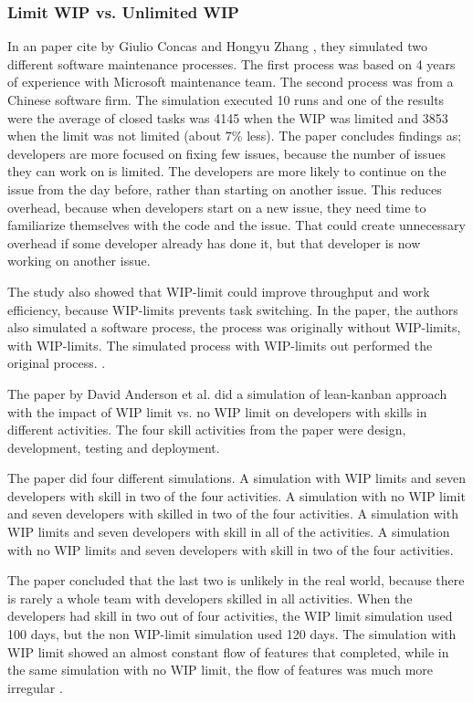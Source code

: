\documentclass[UKenglish]{ifimaster}  %
\begin{document}
\subsubsection {Limit WIP vs. Unlimited WIP}
\label{sub:wip:vs:wip}
In an paper cite by Giulio Concas and Hongyu Zhang \parencite{SMR:SMR1599}, they simulated two different software maintenance processes. The first process was based on 4 years of experience with Microsoft maintenance team. The second process was from a Chinese software firm.  The simulation executed 10 runs and one of the results were the average of closed tasks was 4145 when the WIP was limited and 3853 when the limit was not limited (about 7\% less). The paper concludes findings as; developers are more focused on fixing few issues, because the number of issues they can work on is limited. The developers are more likely to continue on the issue from the day before, rather than starting on another issue. This reduces overhead, because when developers start on a new issue, they need time to familiarize themselves with the code and the issue. That could create unnecessary overhead if some developer already has done it, but that developer is now working on another issue. 

The study also showed that WIP-limit could improve throughput and work efficiency, because WIP-limits prevents task switching. In the paper, the authors also simulated a software process, the process was originally without WIP-limits, with WIP-limits. The simulated process with WIP-limits out performed the original process. \parencite{SMR:SMR1599}.

The paper by David Anderson et al. \parencite{DavidAnderson} did a simulation of lean-kanban approach with the impact of WIP limit vs. no WIP limit on developers with skills in different activities. The four skill activities from the paper were design, development, testing and deployment. 

The paper did four different simulations.  A simulation with WIP limits and seven developers with skill in two of the four activities. A simulation with no WIP limit and seven developers with skilled in two of the four activities. A simulation with WIP limits and seven developers with skill in all of the activities. A simulation with no WIP limits and seven developers with skill in two of the four activities.

The paper concluded that the last two is unlikely in the real world, because there is rarely a whole team with developers skilled in all activities. 
When the developers had skill in two out of four activities, the WIP limit simulation used 100 days, but the non WIP-limit simulation used 120 days. The simulation with WIP limit showed an almost constant flow of features that completed, while in the same simulation with no WIP limit, the flow of features was much more irregular \parencite{DavidAnderson}.
\end{document}

